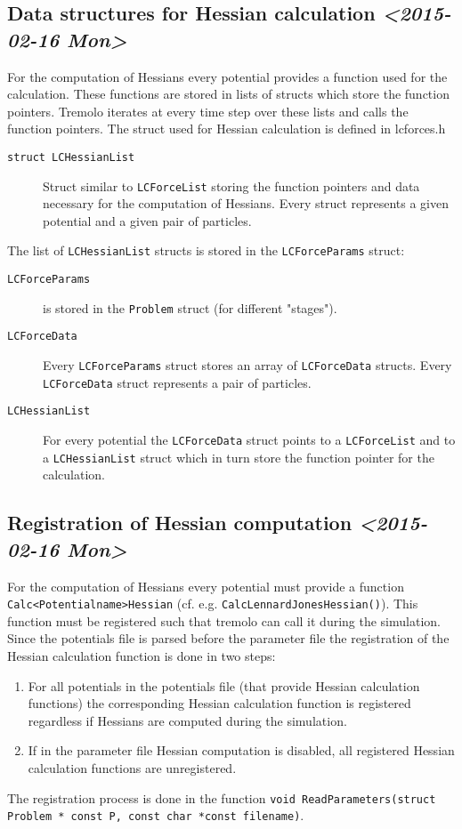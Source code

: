\documentclass[11pt]{article}
\begin{document}
\subsection{Data structures for Hessian calculation \textit{<2015-02-16 Mon>}}
\label{sec-1-2}
For the computation of Hessians every potential provides a function used for the calculation. These functions are stored in lists of structs which store the function pointers. Tremolo iterates at every time step over these lists and calls the function pointers.
The struct used for Hessian calculation is defined in lcforces.h
\begin{description}
\item[{\texttt{struct LCHessianList}}] Struct similar to \texttt{LCForceList} storing the function pointers and data necessary for the computation of Hessians. Every struct represents a given potential and a given pair of particles.
\end{description}
The list of \texttt{LCHessianList} structs is stored in the \texttt{LCForceParams} struct:
\begin{description}
\item[{\texttt{LCForceParams}}] is stored in the \texttt{Problem} struct (for different "stages").
\item[{\texttt{LCForceData}}] Every \texttt{LCForceParams} struct stores an array of \texttt{LCForceData} structs. Every \texttt{LCForceData} struct represents a pair of particles.
\item[{\texttt{LCHessianList}}] For every potential the \texttt{LCForceData} struct points to a \texttt{LCForceList} and to a \texttt{LCHessianList} struct which in turn store the function pointer for the calculation.
\end{description}
\subsection{Registration of Hessian computation \textit{<2015-02-16 Mon>}}
\label{sec-1-3}
For the computation of Hessians every potential must provide a function \texttt{Calc<Potentialname>Hessian} (cf. e.g. \texttt{CalcLennardJonesHessian()}).
This function must be registered such that tremolo can call it during the simulation. Since the potentials file is parsed before the parameter file the registration of the Hessian calculation function is done in two steps:
\begin{enumerate}
\item For all potentials in the potentials file (that provide Hessian calculation functions) the corresponding Hessian calculation function is registered regardless if Hessians are computed during the simulation.
\item If in the parameter file Hessian computation is disabled, all registered Hessian calculation functions are unregistered.
\end{enumerate}
The registration process is done in the function \texttt{void ReadParameters(struct Problem * const P, const char *const filename)}.
\end{document}
